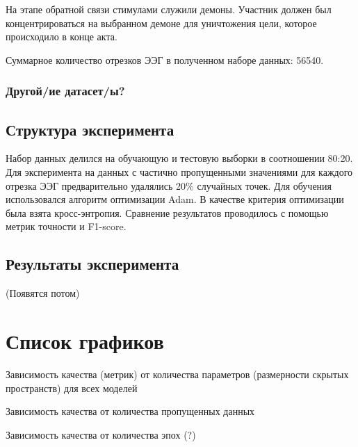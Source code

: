 \documentclass{article}
\begin{document}
На этапе обратной связи стимулами служили демоны. Участник должен был концентрироваться на выбранном демоне для уничтожения цели, которое происходило в конце акта.

Суммарное количество отрезков ЭЭГ в полученном наборе данных: 56540.

\subsubsection{Другой/ие датасет/ы?}

\subsection{Структура эксперимента}

Набор данных делился на обучающую и тестовую выборки в соотношении 80:20. Для эксперимента на данных с частично пропущенными значениями для каждого отрезка ЭЭГ предварительно удалялись 20\% случайных точек. Для обучения использовался алгоритм оптимизации Adam. В качестве критерия оптимизации была взята кросс-энтропия. Сравнение результатов проводилось с помощью метрик точности и F1-score. 

\subsection{Результаты эксперимента}

(Появятся потом)


\section{Список графиков}

Зависимость качества (метрик) от количества параметров (размерности скрытых пространств) для всех моделей

Зависимость качества от количества пропущенных данных

Зависимость качества от количества эпох (?)









\end{document}
